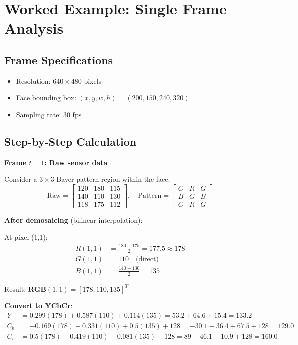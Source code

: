 \documentclass[11pt,a4paper]{article}
\newcommand{\vect}[1]{\bm{#1}}
\begin{document}
\section{Worked Example: Single Frame Analysis}

\subsection{Frame Specifications}

\begin{itemize}
    \item Resolution: $640 \times 480$ pixels
    \item Face bounding box: $(x, y, w, h) = (200, 150, 240, 320)$
    \item Sampling rate: 30 fps
\end{itemize}

\subsection{Step-by-Step Calculation}

\textbf{Frame $t=1$: Raw sensor data}

Consider a $3 \times 3$ Bayer pattern region within the face:
\[
\text{Raw} = \begin{bmatrix}
120 & 180 & 115 \\
140 & 110 & 130 \\
118 & 175 & 112
\end{bmatrix}, \quad
\text{Pattern} = \begin{bmatrix}
G & R & G \\
B & G & B \\
G & R & G
\end{bmatrix}
\]

\textbf{After demosaicing} (bilinear interpolation):

At pixel (1,1):
\begin{align*}
R(1,1) &= \frac{180 + 175}{2} = 177.5 \approx 178 \\
G(1,1) &= 110 \quad \text{(direct)} \\
B(1,1) &= \frac{140 + 130}{2} = 135
\end{align*}

Result: $\vect{RGB}(1,1) = [178, 110, 135]^T$

\textbf{Convert to YCbCr}:
\begin{align*}
Y &= 0.299(178) + 0.587(110) + 0.114(135) = 53.2 + 64.6 + 15.4 = 133.2 \\
C_b &= -0.169(178) - 0.331(110) + 0.5(135) + 128 = -30.1 - 36.4 + 67.5 + 128 = 129.0 \\
C_r &= 0.5(178) - 0.419(110) - 0.081(135) + 128 = 89 - 46.1 - 10.9 + 128 = 160.0
\end{align*}
\end{document}

